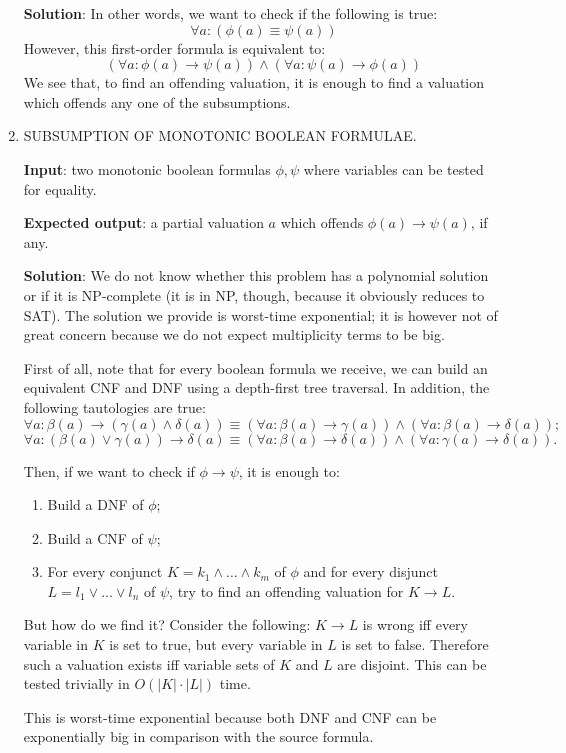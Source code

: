 \documentclass[a4paper,14pt]{extreport}
\begin{document}
\begin{enumerate}
        \textbf{Solution}: In other words, we want to check if the following is
        true:
        \[ \forall a: (\phi(a) \equiv \psi(a)) \]
        However, this first-order formula is equivalent to:
        \[
            (\forall a: \phi(a) \to \psi(a)) \land
            (\forall a: \psi(a) \to \phi(a))
        \]
        We see that, to find an offending valuation, it is enough to find a
        valuation which offends any one of the subsumptions.

    \item SUBSUMPTION OF MONOTONIC BOOLEAN FORMULAE.

        \textbf{Input}: two monotonic boolean formulas $\phi, \psi$ where
        variables can be tested for equality.

        \textbf{Expected output}: a partial valuation $a$ which offends
        $\phi(a) \to \psi (a)$, if any.

        \textbf{Solution}: We do not know whether this problem has a polynomial
        solution or if it is NP-complete (it is in NP, though, because it
        obviously reduces to SAT). The solution we provide is worst-time
        exponential; it is however not of great concern because we do not expect
        multiplicity terms to be big.

        First of all, note that for every boolean formula we receive, we can
        build an equivalent CNF and DNF using a depth-first tree traversal. In
        addition, the following tautologies are true:
        \[
            \forall a: \beta(a) \to (\gamma(a) \land \delta(a))
            \equiv (\forall a: \beta(a) \to \gamma(a))
            \land (\forall a: \beta(a) \to \delta(a));
        \]
        \[
            \forall a: (\beta(a) \lor \gamma(a)) \to \delta(a)
            \equiv (\forall a: \beta(a) \to \delta(a))
            \land (\forall a: \gamma(a) \to \delta(a)).
        \]

        Then, if we want to check if $\phi \to \psi$, it is enough to:
        \begin{enumerate}
            \item Build a DNF of $\phi$;
            \item Build a CNF of $\psi$;
            \item For every conjunct $K = k_1 \land \ldots \land k_m$ of $\phi$
                and for every disjunct $L = l_1 \lor \ldots \lor l_n$ of $\psi$,
                try to find an offending valuation for $K \to L$.
        \end{enumerate}

        But how do we find it? Consider the following: $K \to L$ is wrong iff
        every variable in $K$ is set to true, but every variable in $L$ is set
        to false. Therefore such a valuation exists iff variable sets of $K$ and
        $L$ are disjoint. This can be tested trivially in $O(|K| \cdot |L|)$
        time.

        This is worst-time exponential because both DNF and CNF can be
        exponentially big in comparison with the source formula.
\end{enumerate}
\end{document}
